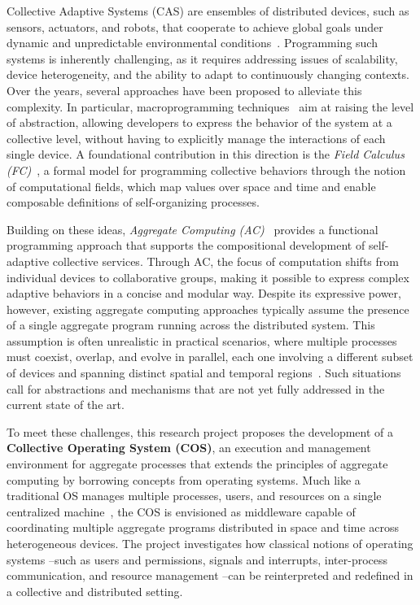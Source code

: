 \documentclass[runningheads]{llncs}
\begin{document}
    Collective Adaptive Systems (CAS) are ensembles of distributed devices, such as sensors,
    actuators,
    and robots,
    that cooperate to achieve global goals under dynamic and unpredictable environmental conditions~\cite{DBLP:conf/huc/Ferscha15}.
    Programming such systems is inherently challenging,
    as it requires addressing issues of scalability, device heterogeneity,
    and the ability to adapt to continuously changing contexts.
    Over the years,
    several approaches have been proposed to alleviate this complexity.
    In particular,
    macroprogramming techniques~\cite{casadei22} aim at raising the level of abstraction,
    allowing developers to express the behavior of the system at a collective level,
    without having to explicitly manage the interactions of each single device.
    A foundational contribution in this direction is the \emph{Field Calculus (FC)}~\cite{JLAMP2019,TOCL2019},
    a formal model for programming collective behaviors through the notion of computational fields,
    which map values over space and time and enable composable definitions of self-organizing processes.

    Building on these ideas,
    \emph{Aggregate Computing (AC)}~\cite{BealIEEEComputer2015} provides a functional programming approach that supports the compositional development of self-adaptive collective services.
    Through AC,
    the focus of computation shifts from individual devices to collaborative groups,
    making it possible to express complex adaptive behaviors in a concise and modular way.
    Despite its expressive power,
    however,
    existing aggregate computing approaches typically assume the presence of a single aggregate program running across the distributed system. This
    assumption is often unrealistic in practical scenarios,
    where multiple processes must coexist,
    overlap,
    and evolve in parallel,
    each one involving a different subset of devices and spanning distinct spatial and temporal regions~\cite{EAAI2020-processes}.
    Such situations call for abstractions and mechanisms that are not yet fully addressed in the current state of the art.

    To meet these challenges,
    this research project proposes the development of a \textbf{Collective Operating System (COS)},
    an execution and management environment for aggregate processes that extends the principles of aggregate computing by borrowing concepts from operating systems.
    Much like a traditional OS manages multiple processes, users,
    and resources on a single centralized machine~\cite{DBLP:journals/csur/TanenbaumR85},
    the COS is envisioned as middleware capable of coordinating multiple aggregate programs distributed in space and time across heterogeneous devices.
    The project investigates how classical notions of operating systems --such as users and permissions, signals and interrupts,
    inter-process communication, and resource management --can be reinterpreted and redefined in a collective and distributed setting.
\end{document}
